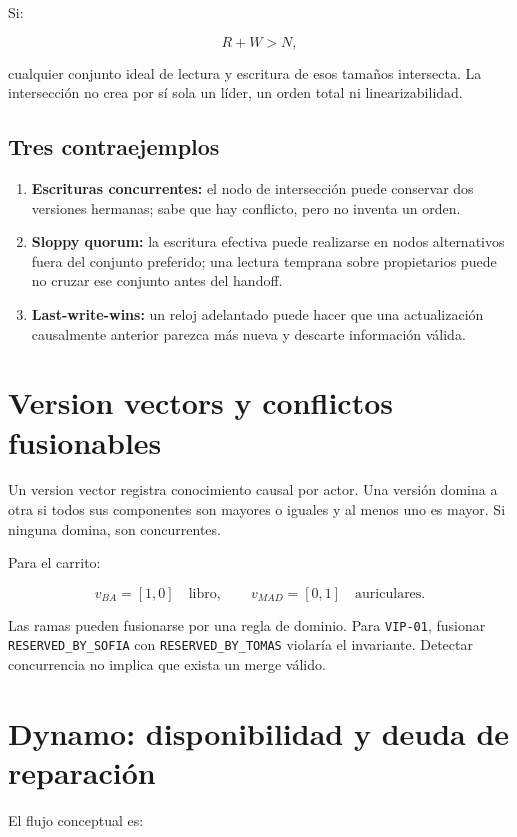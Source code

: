\documentclass[variant=apuntes,cover=institutional,mode=screen]{ua-engineering-v6-article}
\begin{document}
Si:

\[
R+W>N,
\]

cualquier conjunto ideal de lectura y escritura de esos tamaños intersecta. La intersección no crea por sí sola un líder, un orden total ni linearizabilidad.

\subsection{Tres contraejemplos}

\begin{enumerate}
\item \textbf{Escrituras concurrentes:} el nodo de intersección puede conservar dos versiones hermanas; sabe que hay conflicto, pero no inventa un orden.
\item \textbf{Sloppy quorum:} la escritura efectiva puede realizarse en nodos alternativos fuera del conjunto preferido; una lectura temprana sobre propietarios puede no cruzar ese conjunto antes del handoff.
\item \textbf{Last-write-wins:} un reloj adelantado puede hacer que una actualización causalmente anterior parezca más nueva y descarte información válida.
\end{enumerate}

\section{Version vectors y conflictos fusionables}

Un version vector registra conocimiento causal por actor. Una versión domina a otra si todos sus componentes son mayores o iguales y al menos uno es mayor. Si ninguna domina, son concurrentes.

Para el carrito:

\[
v_{BA}=[1,0]\quad\text{libro},\qquad v_{MAD}=[0,1]\quad\text{auriculares}.
\]

Las ramas pueden fusionarse por una regla de dominio. Para \texttt{VIP-01}, fusionar \texttt{RESERVED\_BY\_SOFIA} con \texttt{RESERVED\_BY\_TOMAS} violaría el invariante. Detectar concurrencia no implica que exista un merge válido.

\section{Dynamo: disponibilidad y deuda de reparación}

El flujo conceptual es:
\end{document}
